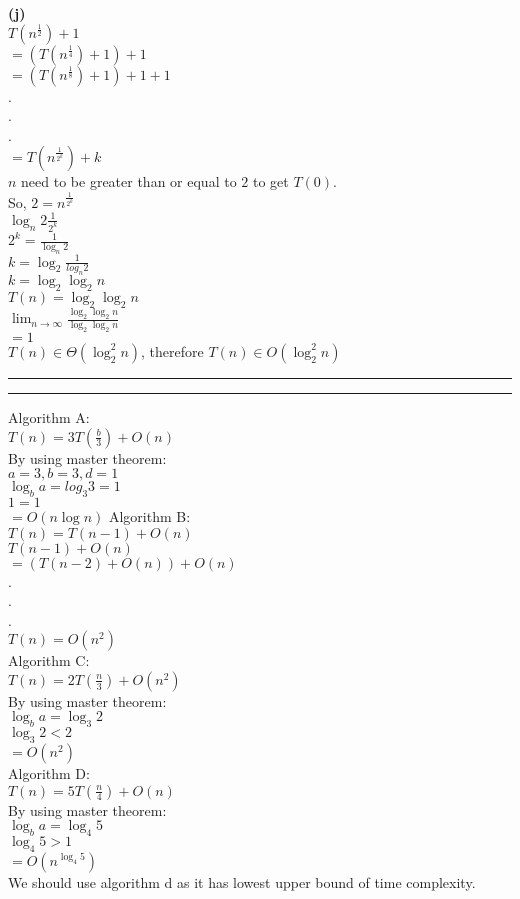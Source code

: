 \documentclass[a4paper, 11pt]{article}
\newcommand{\question}[2] {\vspace{.25in} \hrule\vspace{0.5em}
\noindent{\bf #1: #2} \vspace{0.5em}
\hrule \vspace{.10in}}
\renewcommand{\part}[1] {\vspace{.10in} {\bf (#1)}}
\begin{document}
\part{j}\\
$T(n^{\frac{1}{2}})+1$\\
$=(T(n^{\frac{1}{4}})+1)+1$\\
$=(T(n^{\frac{1}{8}})+1)+1+1$\\
.\\
.\\
.\\
$=T(n^{\frac{1}{2^{k}}})+k$\\
$n$ need to be greater than or equal to $2$ to get $T(0)$.\\
So, $2 = n^{\frac{1}{2^{k}}}$\\
$\log_{n} 2 \frac{1}{2^{k}}$\\
$2^{k} = \frac{1}{\log_{n} 2}$\\
$k = \log_2 \frac{1}{log_{n} 2}$\\
$k = \log_2\log_2 n$\\
$T(n)=\log_2\log_2 n$\\
$\lim_{n\to\infty} \frac{\log_2\log_2 n}{\log_2\log_2 n}$\\
$=1$\\
$T(n)\in\Theta(\log_2^{2} n)$, therefore $T(n)\in O(\log_2^{2} n)$
\question{2}{Part2}
Algorithm A:\\
$T(n)=3T(\frac{b}{3})+O(n)$\\
By using master theorem:\\
$a=3, b=3, d=1$\\
$\log_{b} a = log_3 3 = 1$\\
$1=1$\\
$=O(n\log n)$
Algorithm B:\\
$T(n) = T(n-1)+O(n)$\\
$T(n-1)+O(n)$\\
$=(T(n-2)+O(n))+O(n)$\\
.\\
.\\
.\\
$T(n)=O(n^{2})$\\
Algorithm C:\\
$T(n)=2T(\frac{n}{3})+O(n^{2})$\\
By using master theorem:\\
$\log_{b} a = \log_{3} 2$\\
$\log_{3} 2 < 2$\\
$=O(n^{2})$\\
Algorithm D:\\
$T(n)=5T(\frac{n}{4})+O(n)$\\
By using master theorem:\\
$\log_{b} a = \log_{4} 5$\\
$\log_{4} 5 > 1$\\
$=O(n^{\log_{4} 5})$\\
We should use algorithm d as it has lowest upper bound of time complexity.
\end{document}
